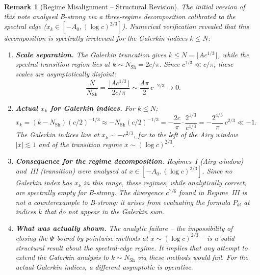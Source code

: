 \documentclass[12pt,a4paper]{article}
\newtheorem{remark}[theorem]{Remark}
\begin{document}
\begin{remark}[Regime Misalignment -- Structural Revision]
\label{rem:misalignment}
The initial version of this note analysed B-strong via a
three-regime decomposition calibrated to the \emph{spectral edge}
($x_k \in [-A_0, (\log c)^{2/3}]$).
Numerical verification revealed that this decomposition is
\emph{spectrally irrelevant} for the Galerkin indices $k \leq N$:

\begin{enumerate}
  \item \textbf{Scale separation.}
        The Galerkin truncation gives $k \leq N = \lfloor Ac^{1/3}\rfloor$,
        while the spectral transition region lies at
        $k \sim N_{\mathrm{Sh}} = 2c/\pi$.  Since $c^{1/3} \ll c/\pi$,
        these scales are asymptotically disjoint:
        \[
          \frac{N}{N_{\mathrm{Sh}}} = \frac{\lfloor Ac^{1/3}\rfloor}{2c/\pi}
          \sim \frac{A\pi}{2}\,c^{-2/3} \to 0.
        \]

  \item \textbf{Actual $x_k$ for Galerkin indices.}
        For $k \leq N$:
        \[
          x_k = (k - N_{\mathrm{Sh}})(c/2)^{-1/3}
          \approx -N_{\mathrm{Sh}}(c/2)^{-1/3}
          = -\frac{2c}{\pi}\cdot\frac{2^{1/3}}{c^{1/3}}
          = -\frac{2^{4/3}}{\pi}\,c^{2/3} \ll -1.
        \]
        The Galerkin indices live at $x_k \sim -c^{2/3}$,
        far to the left of the Airy window $|x| \lesssim 1$
        and of the transition regime $x \sim (\log c)^{2/3}$.

  \item \textbf{Consequence for the regime decomposition.}
        Regimes~I (Airy window) and~III (transition) were
        analysed at $x \in [-A_0, (\log c)^{2/3}]$.
        Since no Galerkin index has $x_k$ in this range,
        these regimes, while analytically correct,
        are \emph{spectrally empty} for B-strong.
        The divergence $c^{7/6}$ found in Regime~III is
        not a counterexample to B-strong: it arises from
        evaluating the formula $P_{kl}$ at indices $k$
        that do not appear in the Galerkin sum.

  \item \textbf{What was actually shown.}
        The analytic failure -- the impossibility of closing
        the $\Phi$-bound by pointwise methods at
        $x \sim (\log c)^{2/3}$ -- is a valid structural result
        about the spectral-edge regime.  It implies that any
        attempt to extend the Galerkin analysis to
        $k \sim N_{\mathrm{Sh}}$ via these methods would fail.
        For the actual Galerkin indices, a different
        asymptotic is operative.
\end{enumerate}
\end{remark}
\end{document}
